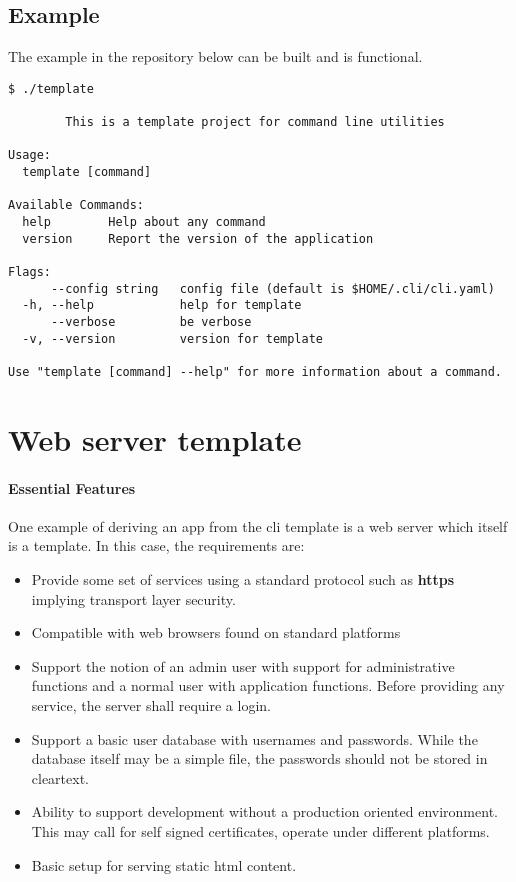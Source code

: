 \documentclass[12pt, a4paper]{article} %
\begin{document}
\subsection{Example}
The example in the repository below can be built and is functional.
\begin{lstlisting}
$ ./template

        This is a template project for command line utilities

Usage:
  template [command]

Available Commands:
  help        Help about any command
  version     Report the version of the application

Flags:
      --config string   config file (default is $HOME/.cli/cli.yaml)
  -h, --help            help for template
      --verbose         be verbose
  -v, --version         version for template

Use "template [command] --help" for more information about a command.

\end{lstlisting}

\section{Web server template}

\paragraph{Essential Features}
One example of deriving an app from the cli template is a web server which itself is a template. In this case, the requirements are:

\begin{itemize}
    \item Provide some set of services using a standard protocol such as \textbf{https} implying transport layer security.
    \item Compatible with web browsers found on standard platforms
    \item Support the notion of an admin user with support for administrative functions and a normal user with application functions. Before providing any service, the server shall require a login.
    \item Support a basic user database with usernames and passwords. While the database itself may be a simple file, the passwords should not be stored in cleartext.
    \item Ability to support development without a production oriented environment. This may call for self signed certificates, operate under different platforms.
    \item Basic setup for serving static html content.
\end{itemize}
\end{document}
